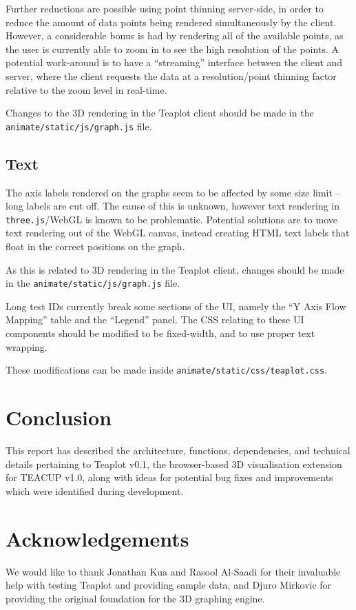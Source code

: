 \documentclass[a4paper,twocolumn,english,11pt, a4paper, conference]{IEEEtran}
\begin{document}
Further reductions are possible using point thinning server-side, in order to reduce the amount of data points being rendered simultaneously by the client. However, a considerable bonus is had by rendering all of the available points, as the user is currently able to zoom in to see the high resolution of the points. A potential work-around is to have a ``streaming'' interface between the client and server, where the client requests the data at a resolution/point thinning factor relative to the zoom level in real-time.

Changes to the 3D rendering in the Teaplot client should be made in the \texttt{animate/static/js/graph.js} file.

\subsection{Text}

The axis labels rendered on the graphs seem to be affected by some size limit -- long labels are cut off. The cause of this is unknown, however text rendering in \texttt{three.js}/WebGL is known to be problematic. Potential solutions are to move text rendering out of the WebGL canvas, instead creating HTML text labels that float in the correct positions on the graph.

As this is related to 3D rendering in the Teaplot client, changes should be made in the \texttt{animate/static/js/graph.js} file.

Long test IDs currently break some sections of the UI, namely the ``Y Axis Flow Mapping'' table and the ``Legend'' panel. The CSS relating to these UI components should be modified to be fixed-width, and to use proper text wrapping. 

These modifications can be made inside \texttt{animate/static/css/teaplot.css}.

\section{Conclusion}
\label{sect:Conclusion}

This report has described the architecture, functions, dependencies, and technical details pertaining to Teaplot v0.1, the browser-based 3D visualisation extension for TEACUP v1.0, along with ideas for potential bug fixes and improvements which were identified during development.
\section*{Acknowledgements}
We would like to thank Jonathan Kua and Rasool Al-Saadi for their invaluable help with testing Teaplot and providing sample data, and Djuro Mirkovic for providing the original foundation for the 3D graphing engine.
\end{document}
